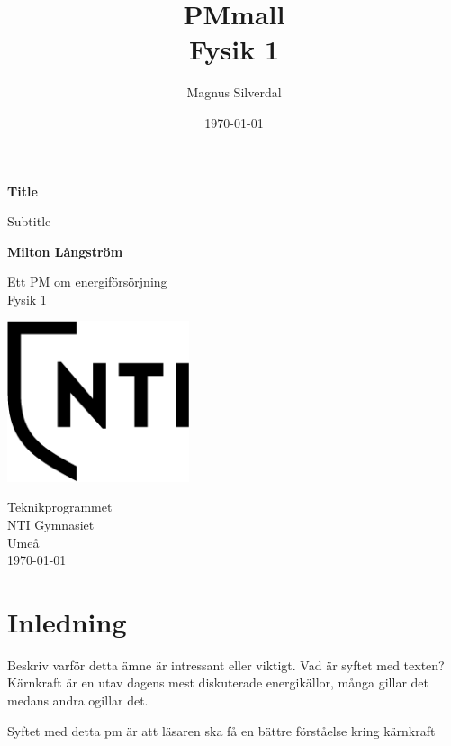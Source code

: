 \documentclass[11p]{article}
\title{PMmall \\ \small Fysik 1}
\author{Magnus Silverdal }
\date{\today}
\begin{document}
    \begin{titlepage}
        \begin{center}
            \vspace*{1cm}

            \Huge
            \textbf{Title}

            \vspace{0.5cm}
            \LARGE
            Subtitle

            \vspace{1.5cm}

            \textbf{Milton Långström}

            \vfill

            Ett PM om energiförsörjning \\
            Fysik 1

            \vspace{0.8cm}

            \includegraphics[width=0.4\textwidth]{NTI Gymnasiet_Symbol_print_svart}

            \Large
            Teknikprogrammet\\
            NTI Gymnasiet\\
            Umeå\\
            \today

        \end{center}
    \end{titlepage}
    \tableofcontents
    \newpage

    \section{Inledning}
    Beskriv varför detta ämne är intressant eller viktigt. Vad är syftet med texten?
    Kärnkraft är en utav dagens mest diskuterade energikällor, många gillar det medans andra ogillar det.

    Syftet med detta pm är att läsaren ska få en bättre förståelse kring kärnkraft
\end{document}

